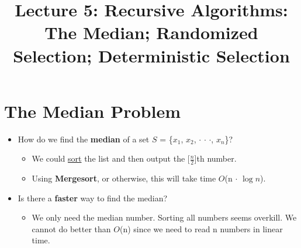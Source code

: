 \documentclass[12pt]{article}
\title{\huge Lecture 5: Recursive Algorithms: The Median; Randomized Selection; Deterministic Selection}
\author{}
\date{}
\begin{document}
\maketitle


\section{The Median Problem}
\renewcommand{\labelitemii}{$\circ$}
\renewcommand{\labelitemiii}{$\cdot$}
\renewcommand{\labelitemiii}{$\rightarrow$}
\renewcommand{\labelitemiv}{$\star$}
\begin{itemize}
\item How do we find the \textbf{median} of a set {\large$S$ = \{$x_1$, $x_2$, $\cdot$ $\cdot$ $\cdot$, $x_n$\}}?
	\begin{itemize}
	\item We could \underline{sort} the list and then output the [$\frac{n}{2}$]th number.
	\item Using \textbf{Mergesort}, or otherwise, this will take time $O$(n $\cdot$ $\log{}n$).
	\end{itemize}
\item Is there a \textbf{faster} way to find the median?
	\begin{itemize}
	\item We only need the median number. Sorting all numbers seems overkill. We cannot do better than $O$(n) since we need to read n numbers in linear time.
	\end{itemize}
\end{itemize}
\end{document}
